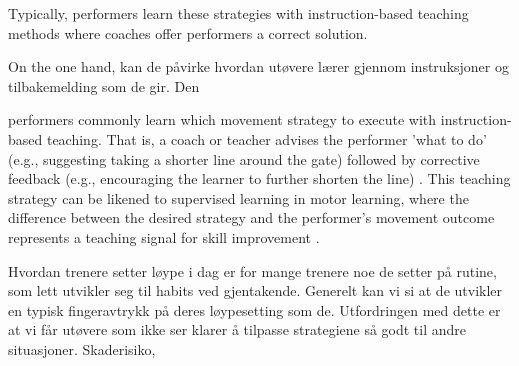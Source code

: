 Typically, performers learn these strategies with instruction-based teaching methods where coaches offer performers a correct solution. 


On the one hand, kan de påvirke hvordan utøvere lærer gjennom instruksjoner og tilbakemelding som de gir. Den 



performers commonly learn which movement strategy to execute with instruction-based teaching. That is, a coach or teacher advises the performer 'what to do' (e.g., suggesting taking a shorter line around the gate) followed by corrective feedback (e.g., encouraging the learner to further shorten the line) \cite{williams_practice_2005, williams_effective_2023, hodges_modelling_2002}. This teaching strategy can be likened to supervised learning in motor learning, where the difference between the desired strategy and the performer's movement outcome represents a teaching signal for skill improvement  \cite{jordan_forward_1992, wolpert_motor_2010, doya_complementary_2000}. 




Hvordan trenere setter løype i dag er for mange trenere noe de setter på rutine, som lett utvikler seg til habits ved gjentakende. Generelt kan vi si at de utvikler en typisk fingeravtrykk på deres løypesetting som de. Utfordringen med dette er at vi får utøvere som ikke ser klarer å tilpasse strategiene så godt til andre situasjoner. Skaderisiko, 

